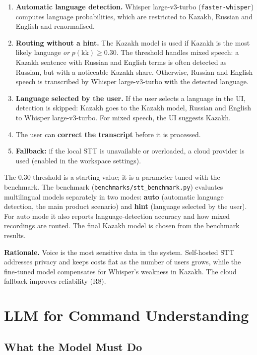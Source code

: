 \documentclass[11pt,a4paper]{article}
\newcommand{\code}[1]{\texttt{#1}}
\begin{document}
\begin{enumerate}
  \item \textbf{Automatic language detection.} Whisper large-v3-turbo (\code{faster-whisper}) computes language probabilities, which are restricted to Kazakh, Russian and English and renormalised.
  \item \textbf{Routing without a hint.} The Kazakh model is used if Kazakh is the most likely language \emph{or} $p(\mathrm{kk}) \ge 0.30$. The threshold handles mixed speech: a Kazakh sentence with Russian and English terms is often detected as Russian, but with a noticeable Kazakh share. Otherwise, Russian and English speech is transcribed by Whisper large-v3-turbo with the detected language.
  \item \textbf{Language selected by the user.} If the user selects a language in the UI, detection is skipped: Kazakh goes to the Kazakh model, Russian and English to Whisper large-v3-turbo. For mixed speech, the UI suggests Kazakh.
  \item The user can \textbf{correct the transcript} before it is processed.
  \item \textbf{Fallback:} if the local STT is unavailable or overloaded, a cloud provider is used (enabled in the workspace settings).
\end{enumerate}

The 0.30 threshold is a starting value; it is a parameter tuned with the benchmark. The benchmark (\code{benchmarks/stt\_benchmark.py}) evaluates multilingual models separately in two modes: \textbf{auto} (automatic language detection, the main product scenario) and \textbf{hint} (language selected by the user). For auto mode it also reports language-detection accuracy and how mixed recordings are routed. The final Kazakh model is chosen from the benchmark results.

\textbf{Rationale.} Voice is the most sensitive data in the system. Self-hosted STT addresses privacy and keeps costs flat as the number of users grows, while the fine-tuned model compensates for Whisper's weakness in Kazakh. The cloud fallback improves reliability (R8).

\section{LLM for Command Understanding}\label{sec:llm}

\subsection{What the Model Must Do}
\end{document}
